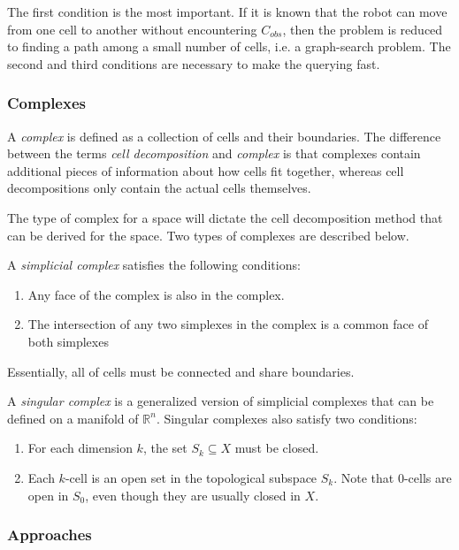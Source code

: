 \documentclass[10pt,conference]{ieeeconf}
\begin{document}
The first condition is the most important. If it is known that the robot can move from one cell to another without encountering $C_{obs}$, then the problem is reduced to finding a path among a small number of cells, i.e. a graph-search problem. The second and third conditions are necessary to make the querying fast.


\subsubsection{Complexes}

A \emph{complex} is defined as a collection of cells and their boundaries. The difference between the terms \emph{cell decomposition} and \emph{complex} is that complexes contain additional pieces of information about how cells fit together, whereas cell decompositions only contain the actual cells themselves. 

The type of complex for a space will dictate the cell decomposition method that can be derived for the space. Two types of complexes are described below.

A \emph{simplicial complex} satisfies the following conditions:

\begin{enumerate}
\item Any face of the complex is also in the complex.
\item The intersection of any two simplexes in the complex is a common face of both simplexes
\end{enumerate}

Essentially, all of cells must be connected and share boundaries. 

A \emph{singular complex} is a generalized version of simplicial complexes that can be defined on a manifold of $\mathbb{R}^n$. Singular complexes also satisfy two conditions:

\begin{enumerate}
\item For each dimension $k$, the set $S_k \subseteq X$ must be closed. 
\item Each $k$-cell is an open set in the topological subspace $S_k$. Note that 0-cells are open in $S_0$, even though they are usually closed in $X$.
\end{enumerate} 

\subsubsection{Approaches}
\end{document}

